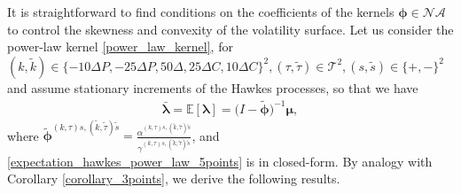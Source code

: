 \documentclass[12pt]{article}
\begin{document}
It is straightforward to find conditions on the coefficients of the kernels $\boldsymbol{\phi}\in \mathcal{{NA}}$ to control the skewness and convexity of the volatility surface. Let us consider the power-law kernel \eqref{power_law_kernel}, for $(k,\tilde k)\in \{-10\Delta P,-25\Delta P, 50\Delta, 25\Delta C,10\Delta C\}^2, (\tau,\tilde \tau)\in \mathcal{T}^2,  (s,\tilde s)\in \{+,-\}^2$ and assume stationary increments of the Hawkes processes, so that we have
\begin{align}\label{expectation_hawkes_power_law_5points}
    \boldsymbol{\bar \lambda} = \mathbb{E}[\boldsymbol{\lambda}] = \big(I - \boldsymbol{\tilde{\phi}}\big)^{-1}\boldsymbol{\mu}, 
\end{align}
where $\boldsymbol{\tilde{\phi}}^{(k,\tau)s,(\tilde k,\tilde \tau)\tilde s} = \frac{\alpha^{(k,\tau)s,(\tilde k,\tilde \tau)\tilde s}}{\gamma^{(k,\tau)s,(\tilde k,\tilde \tau)\tilde s}}$, and \eqref{expectation_hawkes_power_law_5points} is in closed-form. By analogy with Corollary \ref{corollary_3points}, we derive the following results.
\end{document}
